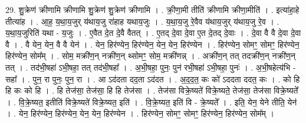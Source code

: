 \documentclass[17pt]{extarticle}
\begin{document}
29. शु॒क्रेण॑ क्रीणामि क्रीणामि शु॒क्रेण॑ शु॒क्रेण॑ क्रीणामि । . क्री॒णा॒मी तीति॑ क्रीणामि क्रीणा॒मीति॑ । . इत्या॑हा॒हे तीत्या॑ह । . आ॒ह॒ य॒था॒य॒जुर् य॑थाय॒जु रा॑हाह यथाय॒जुः । . य॒था॒य॒जु रे॒वैव य॑थाय॒जुर् य॑थाय॒जु रे॒व । . य॒था॒य॒जुरिति॑ यथा - य॒जुः । . ए॒वैत दे॒त दे॒वै वैतत् । . ए॒तद् दे॒वा दे॒वा ए॒त दे॒तद् दे॒वाः । . दे॒वा वै वै दे॒वा दे॒वा वै । . वै येन॒ येन॒ वै वै येन॑ । . येन॒ हिर॑ण्येन॒ हिर॑ण्येन॒ येन॒ येन॒ हिर॑ण्येन । . हिर॑ण्येन॒ सोमꣳ॒॒ सोमꣳ॒॒ हिर॑ण्येन॒ हिर॑ण्येन॒ सोम᳚म् । . सोम॒ मक्री॑ण॒न् नक्री॑ण॒न् थ्सोमꣳ॒॒ सोम॒ मक्री॑णन्न् । . अक्री॑ण॒न् तत् तदक्री॑ण॒न् नक्री॑ण॒न् तत् । . तद॑भी॒षहा॑ ऽभी॒षहा॒ तत् तद॑भी॒षहा᳚ । . अ॒भी॒षहा॒ पुनः॒ पुन॑ रभी॒षहा॑ ऽभी॒षहा॒ पुनः॑ । . अ॒भी॒षहेत्य॑भि - सहा᳚ । . पुन॒ रा पुनः॒ पुन॒ रा । . आ ऽद॑दता दद॒ता ऽद॑दत । . अ॒द॒द॒त॒ कः को॑ ऽददता ददत॒ कः । . को हि हि कः को हि । . हि तेज॑सा॒ तेज॑सा॒ हि हि तेज॑सा । . तेज॑सा विक्रे॒ष्यते॑ विक्रे॒ष्यते॒ तेज॑सा॒ तेज॑सा विक्रे॒ष्यते᳚ । . वि॒क्रे॒ष्यत॒ इतीति॑ विक्रे॒ष्यते॑ विक्रे॒ष्यत॒ इति॑ । . वि॒क्रे॒ष्यत॒ इति॑ वि - क्रे॒ष्यते᳚ । . इति॒ येन॒ येने तीति॒ येन॑ । . येन॒ हिर॑ण्येन॒ हिर॑ण्येन॒ येन॒ येन॒ हिर॑ण्येन । . हिर॑ण्येन॒ सोमꣳ॒॒ सोमꣳ॒॒ हिर॑ण्येन॒ हिर॑ण्येन॒ सोम᳚म् । \newline
\end{document}
